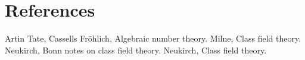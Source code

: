 %







\chapter{References}

\begin{thebibliography}{50}
	Artin Tate,
	Cassells Fr\"ohlich,
	Algebraic number theory.
  Milne,
  Class field theory.
	Neukirch,
	Bonn notes on class field theory.
  Neukirch,
  Class field theory.

\end{thebibliography}
